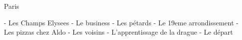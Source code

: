 Paris

- Les Champs Elysees
- Le business 
- Les pétards
- Le 19eme arrondissement
- Les pizzas chez Aldo 
- Les voisins
- L'apprentissage de la drague
- Le départ
